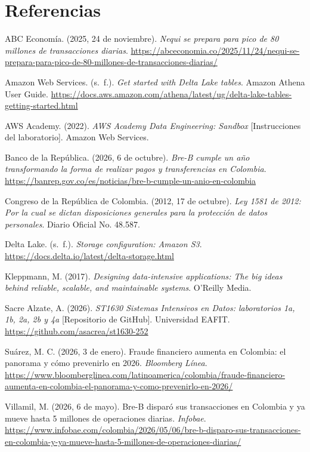 \documentclass[12pt,letterpaper]{article}
\begin{document}
\section*{Referencias}
\begin{footnotesize}
\setlength{\parindent}{0pt}\setlength{\parskip}{3pt}

ABC Economía. (2025, 24 de noviembre). \emph{Nequi se prepara para pico de 80 millones de transacciones diarias}. \url{https://abceconomia.co/2025/11/24/nequi-se-prepara-para-pico-de-80-millones-de-transacciones-diarias/}

Amazon Web Services. (s.~f.). \emph{Get started with Delta Lake tables}. Amazon Athena User Guide. \url{https://docs.aws.amazon.com/athena/latest/ug/delta-lake-tables-getting-started.html}

AWS Academy. (2022). \emph{AWS Academy Data Engineering: Sandbox} [Instrucciones del laboratorio]. Amazon Web Services.

Banco de la República. (2026, 6 de octubre). \emph{Bre-B cumple un año transformando la forma de realizar pagos y transferencias en Colombia}. \url{https://banrep.gov.co/es/noticias/bre-b-cumple-un-anio-en-colombia}

Congreso de la República de Colombia. (2012, 17 de octubre). \emph{Ley 1581 de 2012: Por la cual se dictan disposiciones generales para la protección de datos personales}. Diario Oficial No. 48.587.

Delta Lake. (s.~f.). \emph{Storage configuration: Amazon S3}. \url{https://docs.delta.io/latest/delta-storage.html}

Kleppmann, M. (2017). \emph{Designing data-intensive applications: The big ideas behind reliable, scalable, and maintainable systems}. O'Reilly Media.

Sacre Alzate, A. (2026). \emph{ST1630 Sistemas Intensivos en Datos: laboratorios 1a, 1b, 2a, 2b y 4a} [Repositorio de GitHub]. Universidad EAFIT. \url{https://github.com/asacrea/st1630-252}

Suárez, M. C. (2026, 3 de enero). Fraude financiero aumenta en Colombia: el panorama y cómo prevenirlo en 2026. \emph{Bloomberg Línea}. \url{https://www.bloomberglinea.com/latinoamerica/colombia/fraude-financiero-aumenta-en-colombia-el-panorama-y-como-prevenirlo-en-2026/}

Villamil, M. (2026, 6 de mayo). Bre-B disparó sus transacciones en Colombia y ya mueve hasta 5 millones de operaciones diarias. \emph{Infobae}. \url{https://www.infobae.com/colombia/2026/05/06/bre-b-disparo-sus-transacciones-en-colombia-y-ya-mueve-hasta-5-millones-de-operaciones-diarias/}\par
\end{footnotesize}
\end{document}
